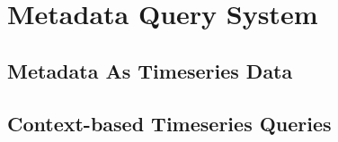 
\chapter{Metadata Query System}

\section{Metadata As Timeseries Data}

\section{Context-based Timeseries Queries}